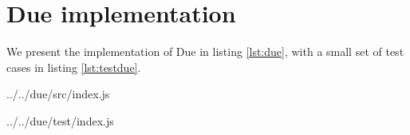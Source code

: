 \vfill\eject
\appendix

\section{Due implementation} \label{section:dueimpl}

We present the implementation of Due in listing \ref{lst:due}, with a small set of test cases in listing \ref{lst:testdue}.

             {../../due/src/index.js}


             {../../due/test/index.js}






